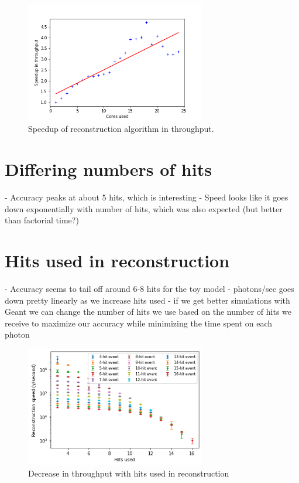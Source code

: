 \begin{figure}
    \centering
    \includegraphics[width=0.7\textwidth]{graphs/Cassini_throughput_speedup.png}
    \caption{Speedup of reconstruction algorithm in throughput.}
    \label{fig:through_speedup}
\end{figure}

\section{Differing numbers of hits}
- Accuracy peaks at about 5 hits, which is interesting
- Speed looks like it goes down exponentially with number of hits, which was also expected (but better than factorial time?)

\section{Hits used in reconstruction}
- Accuracy seems to tail off around 6-8 hits for the toy model
- photons/sec goes down pretty linearly as we increase hits used
- if we get better simulations with Geant we can change the number of hits we use based on the number of hits we receive to maximize our accuracy while minimizing the time spent on each photon

\begin{figure}
    \centering
    \includegraphics[width=0.7\textwidth]{graphs/pi_hits_v_hitsUsed_speed_final.png}
    \caption{Decrease in throughput with hits used in reconstruction}
    \label{fig:hits_v_hitsUsed}
\end{figure}

